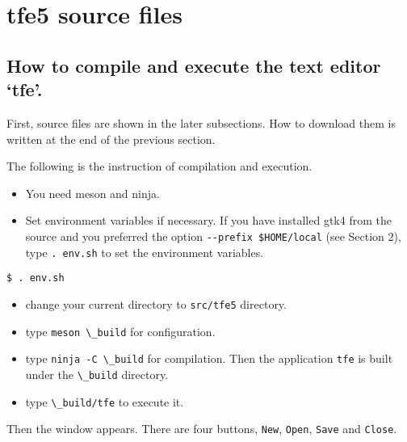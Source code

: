 \hypertarget{tfe5-source-files}{%
\section{tfe5 source files}\label{tfe5-source-files}}

\hypertarget{how-to-compile-and-execute-the-text-editor-tfe.}{%
\subsection{How to compile and execute the text editor
`tfe'.}\label{how-to-compile-and-execute-the-text-editor-tfe.}}

First, source files are shown in the later subsections. How to download
them is written at the end of the previous section.

The following is the instruction of compilation and execution.

\begin{itemize}
\tightlist
\item
  You need meson and ninja.
\item
  Set environment variables if necessary. If you have installed gtk4
  from the source and you preferred the option
  \passthrough{\lstinline!--prefix $HOME/local!} (see Section 2), type
  \passthrough{\lstinline!. env.sh!} to set the environment variables.
\end{itemize}

\begin{lstlisting}
$ . env.sh
\end{lstlisting}

\begin{itemize}
\tightlist
\item
  change your current directory to \passthrough{\lstinline!src/tfe5!}
  directory.
\item
  type \passthrough{\lstinline!meson \_build!} for configuration.
\item
  type \passthrough{\lstinline!ninja -C \_build!} for compilation. Then
  the application \passthrough{\lstinline!tfe!} is built under the
  \passthrough{\lstinline!\_build!} directory.
\item
  type \passthrough{\lstinline!\_build/tfe!} to execute it.
\end{itemize}

Then the window appears. There are four buttons,
\passthrough{\lstinline!New!}, \passthrough{\lstinline!Open!},
\passthrough{\lstinline!Save!} and \passthrough{\lstinline!Close!}.

